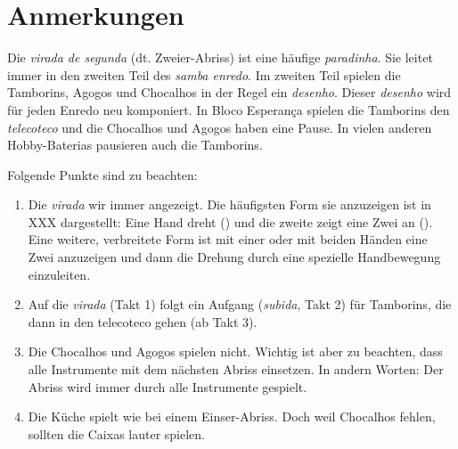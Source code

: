 \documentclass[a4paper,12pt]{bescript}
\begin{document}
\section*{Anmerkungen}
Die {\it virada de segunda} (dt. Zweier-Abriss) ist eine häufige {\it paradinha}. Sie leitet immer in den zweiten Teil des {\it samba enredo}. Im zweiten Teil spielen die Tamborins, Agogos und Chocalhos in der Regel ein {\it desenho}. Dieser {\it desenho} wird für jeden Enredo neu komponiert. In Bloco Esperança spielen die Tamborins den {\it telecoteco} und die Chocalhos und Agogos haben eine Pause. In vielen anderen Hobby-Baterias pausieren auch die Tamborins.

\noindent Folgende Punkte sind zu beachten:
\begin{enumerate}


 \item Die {\it virada} wir immer angezeigt. Die häufigsten Form sie anzuzeigen ist in XXX dargestellt: Eine Hand dreht () und die zweite zeigt eine Zwei an (). Eine weitere, verbreitete Form ist mit einer oder mit beiden Händen eine Zwei anzuzeigen und dann die Drehung durch eine spezielle Handbewegung einzuleiten.

 \item Auf die {\it virada} (Takt 1) folgt ein Aufgang ({\it subida}, Takt 2) für Tamborins, die dann in den telecoteco gehen (ab Takt 3).

 \item Die Chocalhos und Agogos spielen nicht. Wichtig ist aber zu beachten, dass alle Instrumente mit dem nächsten Abriss einsetzen. In andern Worten: Der Abriss wird immer durch alle Instrumente gespielt.
 \item Die Küche spielt wie bei einem Einser-Abriss. Doch weil Chocalhos fehlen, sollten die Caixas lauter spielen.
\end{enumerate}
\end{document}
